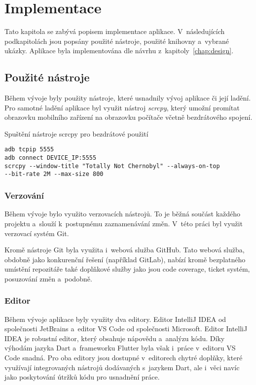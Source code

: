 \chapter{Implementace}
\label{chap:implementation}

Tato kapitola se zabývá popisem implementace aplikace.
V~následujících podkapitolách jsou popsány použité nástroje,
použité knihovny a~vybrané ukázky.
Aplikace byla implementována dle návrhu z~kapitoly~\ref{chap:design}.

\section{Použité nástroje}

Během vývoje byly použity nástroje,
které usnadnily vývoj aplikace či její ladění.
Pro samotné ladění aplikace byl využit nástroj \emph{scrcpy},
který umožní promítat obrazovku mobilního zařízení na obrazovku počítače
včetně bezdrátového spojení.

\begin{listing}
    \caption{Spuštění nástroje scrcpy pro bezdrátové použití}
    \label{code:scrcpy}
    \begin{verbatim}
adb tcpip 5555
adb connect DEVICE_IP:5555
scrcpy --window-title "Totally Not Chernobyl" --always-on-top
--bit-rate 2M --max-size 800
    \end{verbatim}
\end{listing}

\subsection{Verzování}

Během vývoje bylo využito verzovacích nástrojů.
To je běžná součást každého projektu a~slouží k~postupnému zaznamenávání změn.
V~této práci byl využit verzovací systém Git.

Kromě nástroje Git byla využita i~webová služba GitHub.
Tato webová služba,
obdobně jako konkurenční řešení (například GitLab),
nabízí kromě bezplatného umístění repozitáře také doplňkové služby jako jsou
code coverage, ticket systém, posuzování změn a~podobně.

\pagebreak
\subsection{Editor}

Během vývoje aplikace byly využity dva editory.
Editor IntelliJ IDEA od společnosti JetBrains
a~editor VS Code od společnosti Microsoft.
Editor IntelliJ IDEA je robustní editor,
který obsahuje nápovědu a~analýzu kódu.
Díky výhodám jazyka Dart a~frameworku Flutter
byla však i~práce v~editoru VS Code snadná.
Pro oba editory jsou dostupné v~editorech chytré doplňky,
které využívají integrovaných nástrojů dodávaných s~jazykem Dart,
ale i~věci navíc jako poskytování útržků kódu pro usnadnění práce.

